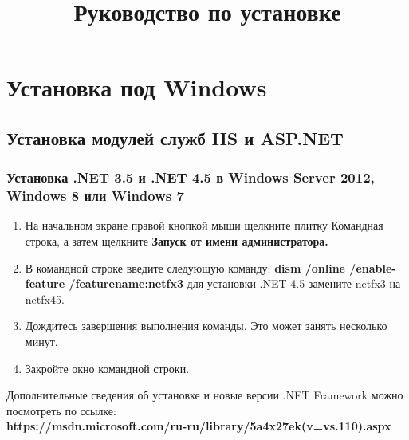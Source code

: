 \documentclass[12pt,a4paper,titlepage]{article}
\title{Руководство по установке}
\begin{document}
\maketitle
\tableofcontents
\newpage
\section{Установка под Windows}
\subsection{Установка модулей служб IIS и ASP.NET}
\subsubsection{Установка .NET 3.5 и .NET 4.5 в Windows Server 2012, Windows 8 или Windows 7}
\begin{enumerate}
\item На начальном экране правой кнопкой мыши щелкните плитку Командная строка, а затем щелкните \textbf{Запуск от имени администратора.}
\item В командной строке введите следующую команду: \textbf{dism /online /enable-feature /featurename:netfx3} для установки .NET 4.5 замените netfx3 на netfx45.
\item Дождитесь завершения выполнения команды. Это может занять несколько минут.
\item Закройте окно командной строки.
\end{enumerate}
Дополнительные сведения об установке и новые версии .NET Framework можно посмотреть по ссылке:
\textbf{\\https://msdn.microsoft.com/ru-ru/library/5a4x27ek(v=vs.110).aspx}
\end{document}
